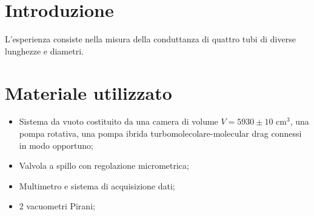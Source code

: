 \section{Introduzione}

L'esperienza consiste nella misura della conduttanza di quattro tubi di diverse lunghezze e diametri.

\section{Materiale utilizzato}

\begin{itemize}
	\item{Sistema da vuoto costituito da una camera di volume $V = 5930 \pm 10$ \si{\centi\metre}$^3$, una pompa rotativa, una pompa ibrida turbomolecolare-molecular drag connessi in modo opportuno;}
	\item{Valvola a spillo con regolazione micrometrica;}
	\item{Multimetro e sistema di acquisizione dati;}
	\item{2 vacuometri Pirani;}
\end{itemize}
